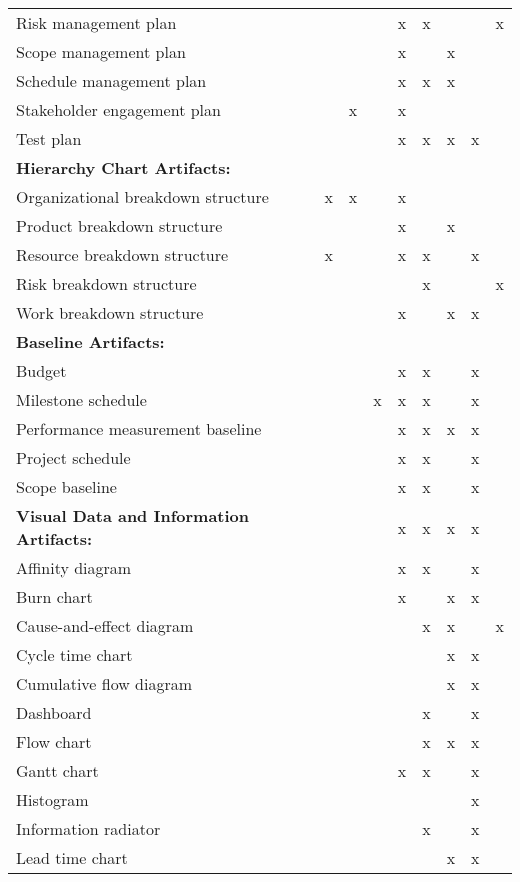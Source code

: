 \documentclass[11pt]{article}
\begin{document}
\begin{center}
\begin{tabular}{lllllllll}
Risk management plan &  &  &  & x & x &  &  & x\\
Scope management plan &  &  &  & x &  & x &  & \\
Schedule management plan &  &  &  & x & x & x &  & \\
Stakeholder engagement plan &  & x &  & x &  &  &  & \\
Test plan &  &  &  & x & x & x & x & \\
\hline
\textbf{Hierarchy Chart Artifacts:} &  &  &  &  &  &  &  & \\
\hline
Organizational breakdown structure & x & x &  & x &  &  &  & \\
Product breakdown structure &  &  &  & x &  & x &  & \\
Resource breakdown structure & x &  &  & x & x &  & x & \\
Risk breakdown structure &  &  &  &  & x &  &  & x\\
Work breakdown structure &  &  &  & x &  & x & x & \\
\hline
\textbf{Baseline Artifacts:} &  &  &  &  &  &  &  & \\
\hline
Budget &  &  &  & x & x &  & x & \\
Milestone schedule &  &  & x & x & x &  & x & \\
Performance measurement baseline &  &  &  & x & x & x & x & \\
Project schedule &  &  &  & x & x &  & x & \\
Scope baseline &  &  &  & x & x &  & x & \\
\hline
\textbf{Visual Data and Information Artifacts:} &  &  &  & x & x & x & x & \\
\hline
Affinity diagram &  &  &  & x & x &  & x & \\
Burn chart &  &  &  & x &  & x & x & \\
Cause-and-effect diagram &  &  &  &  & x & x &  & x\\
Cycle time chart &  &  &  &  &  & x & x & \\
Cumulative flow diagram &  &  &  &  &  & x & x & \\
Dashboard &  &  &  &  & x &  & x & \\
Flow chart &  &  &  &  & x & x & x & \\
Gantt chart &  &  &  & x & x &  & x & \\
Histogram &  &  &  &  &  &  & x & \\
Information radiator &  &  &  &  & x &  & x & \\
Lead time chart &  &  &  &  &  & x & x & \\

\end{tabular}
\end{center}
\end{document}
